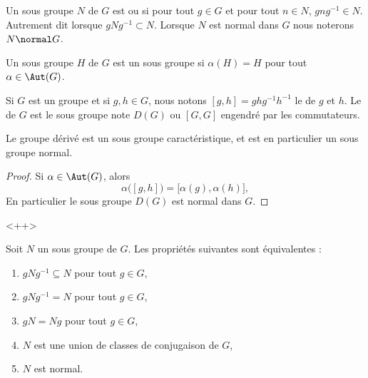 \begin{definition}
    Un sous groupe \( N\) de \( G\) est  ou  si pour tout \( g\in G\) et pour tout \( n\in N\), \( gng^{-1}\in N\). Autrement dit lorsque \( gNg^{-1}\subset N\). Lorsque \( N\) est normal dans \( G\) nous noterons \( N\normal G\).

    Un sous groupe \( H\) de \( G\) est un sous groupe  si \( \alpha(H)=H\) pour tout \( \alpha\in \Aut(G)\).
\end{definition}

Si \( G\) est un groupe et si \( g,h\in G\), nous notons \( [g,h]=ghg^{-1}h^{-1}\) le  de \( g\) et \( h\). Le  de \( G\) est le sous groupe note \( D(G)\) ou \( [G,G]\) engendré par les commutateurs.

\begin{proposition}
    Le groupe dérivé est un sous groupe caractéristique, et est en particulier un sous groupe normal.
\end{proposition}

\begin{proof}
    Si \( \alpha\in \Aut(G)\), alors
    \begin{equation}
        \alpha\big( [g,h] \big)=\big[ \alpha(g),\alpha(h) \big],
    \end{equation}
    En particulier le sous groupe \( D(G)\) est normal dans \( G\).
\end{proof}
<++>

\begin{proposition}
    Soit \( N\) un sous groupe de \( G\). Les propriétés suivantes sont équivalentes :
    \begin{enumerate}
        \item
            \( gNg^{-1}\subseteq N\) pour tout \( g\in G\),
        \item
            \( gNg^{-1}= N\) pour tout \( g\in G\),
        \item
            \( gN=Ng\) pour tout \( g\in G\),
        \item
            \( N\) est une union de classes de conjugaison de \( G\),
        \item
            \( N\) est normal.
    \end{enumerate}
\end{proposition}

